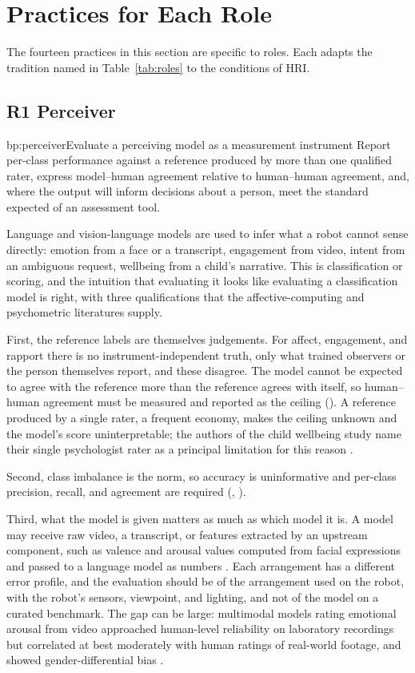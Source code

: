 \section{Practices for Each Role}
\label{sec:rolepractices}

The fourteen practices in this section are specific to roles. Each adapts the
tradition named in Table~\ref{tab:roles} to the conditions of HRI.

\subsection{R1 Perceiver}

\begin{practice}{bp:perceiver}{Evaluate a perceiving model as a measurement instrument}
Report per-class performance against a reference produced by more than one
qualified rater, express model--human agreement relative to human--human
agreement, and, where the output will inform decisions about a person, meet
the standard expected of an assessment tool.
\end{practice}

Language and vision-language models are used to infer what a robot cannot
sense directly: emotion from a face or a transcript, engagement from video,
intent from an ambiguous request, wellbeing from a child's narrative. This is
classification or scoring, and the intuition that evaluating it looks like
evaluating a classification model is right, with three qualifications that
the affective-computing and psychometric literatures supply.

First, the reference labels are themselves judgements. For affect,
engagement, and rapport there is no instrument-independent truth, only what
trained observers or the person themselves report, and these disagree. The
model cannot be expected to agree with the reference more than the reference
agrees with itself, so human--human agreement must be measured and reported
as the ceiling (). A reference produced by a single rater, a
frequent economy, makes the ceiling unknown and the model's score
uninterpretable; the authors of the child wellbeing study name their single
psychologist rater as a principal limitation for this reason
\cite{abbasi2025robotled}.

Second, class imbalance is the norm, so accuracy is uninformative and
per-class precision, recall, and agreement are required (,
).

Third, what the model is given matters as much as which model it is. A model
may receive raw video, a transcript, or features extracted by an upstream
component, such as valence and arousal values computed from facial
expressions and passed to a language model as numbers \cite{mehra2025how}.
Each arrangement has a different error profile, and the evaluation should be
of the arrangement used on the robot, with the robot's sensors, viewpoint,
and lighting, and not of the model on a curated benchmark. The gap can be
large: multimodal models rating emotional arousal from video approached
human-level reliability on laboratory recordings but correlated at best
moderately with human ratings of real-world footage, and showed
gender-differential bias \cite{licht2025computational}.

